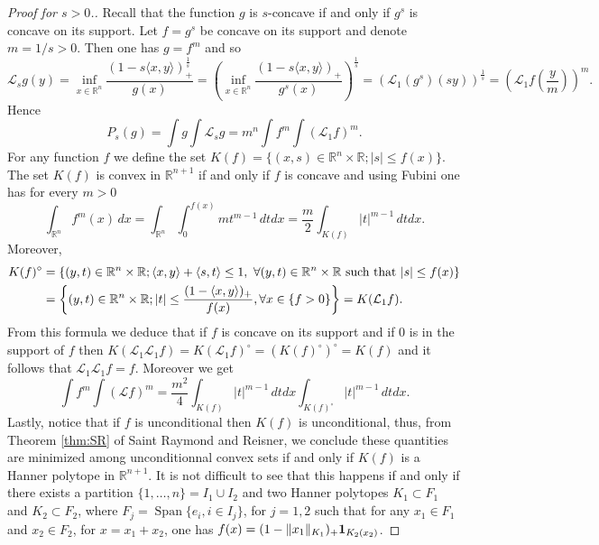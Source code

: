 \documentclass[10pt]{amsart}
\theoremstyle{definition}
\theoremstyle{remark}
\newcommand{\R}{\mathbb{R}}
\renewcommand{\L}{\mathcal{L}}
\newcommand{\Span}{\operatorname{Span}}
\begin{document}
\begin{proof}[Proof for $s>0$.]

Recall that the function $g$ is $s$-concave if and only if $g^s$ is concave on its support. Let $f=g^s$ be concave on its support and denote $m=1/s>0$. Then one has $g=f^m$ and so
\[
\L_s g(y)=\inf_{x\in\R^n}\frac{\left(1-s\langle x,y\rangle\right)_+^\frac{1}{s}}{g(x)}=\left(\inf_{x\in\R^n}\frac{\left(1-s\langle x,y\rangle\right)_+}{g^s(x)}\right)^\frac{1}{s}=\left(\L_1 \left(g^s\right)(s y)\right)^\frac{1}{s}=
\left(\L_1 f\left(\frac{y}{m}\right)\right)^m.
\]
Hence 
\[
P_s(g)=\int g\int\L_s g=m^n\int f^m\int (\L_1 f)^m.
\]
For any function $f$ we define the set $K(f)=\{(x,s)\in\R^n\times\R; |s|\le f(x)\}$. The set $K(f)$ is convex in $\R^{n+1}$ if and only if $f$ is concave and using Fubini one has for every $m>0$
\[
\int_{\R^n}f^m(x)\,dx=\int_{\R^n}\int_0^{f(x)}mt^{m-1}\,dtdx=\frac{m}{2}\int_{K(f)}|t|^{m-1}\,dtdx. 
\]
Moreover, 
\begin{align*}
K(f)^\circ&=\{(y,t)\in\R^n\times\R; \langle x,y\rangle+\langle s,t\rangle\le1,\ \forall(y,t)\in\R^n\times\R\ \hbox{such that}\ |s|\le f(x)\}\\
&=\left\{(y,t)\in\R^n\times\R; |t|\le\frac{(1-\langle x,y\rangle)_+}{f(x)}, \forall x\in\{f>0\}\right\}= K(\L_1 f).
\end{align*}
From this formula we deduce that if $f$ is concave on its support and if $0$ is in the support of $f$ then 
$K(\L_1\L_1 f)=K(\L_1 f)^\circ=(K(f)^\circ)^\circ=K(f)$ and it follows that $\L_1\L_1 f=f$. Moreover we get
\[
\int f^m\int (\L f)^m=\frac{m^2}{4}\int_{K(f)}|t|^{m-1}\,dtdx\int_{K(f)^\circ}|t|^{m-1}\,dtdx.
\]
Lastly, notice that if $f$ is unconditional then $K(f)$ is unconditional, thus, from Theorem \ref{thm:SR} of Saint Raymond and Reisner, we conclude these quantities are minimized among unconditionnal convex sets if and only if $K(f)$ is a Hanner polytope in $\R^{n+1}$. It is not difficult  to see that this happens if and only if there exists a partition $\{1,\dots,n\}=I_1\cup I_2$ and two Hanner polytopes $K_1\subset F_1$ and $K_2\subset F_2$, where $F_j=\Span\{e_i, i\in I_j\}$, for $j=1,2$  such that for any $x_1\in F_1$ and $x_2\in F_2$, for $x=x_1+x_2$, one has $f(x)=(1-\|x_1\|_{K_1})_+{\bf 1}_{K_2(x_2)}$.
\end{proof}
\end{document}
